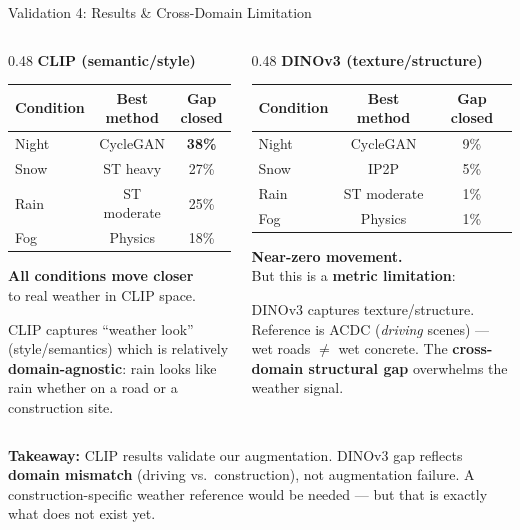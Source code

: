 \documentclass[aspectratio=169, 11pt]{beamer}
\begin{document}
\begin{frame}{Validation 4: Results \& Cross-Domain Limitation}

\begin{columns}[T]
\begin{column}{0.48\textwidth}
\centering
\footnotesize
\textbf{CLIP (semantic/style)}

\vspace{0.3em}
\begin{tabular}{lcc}
\toprule
\textbf{Condition} & \textbf{Best method} & \textbf{Gap closed} \\
\midrule
Night & CycleGAN & \textbf{38\%} \\
Snow & ST heavy & 27\% \\
Rain & ST moderate & 25\% \\
Fog & Physics & 18\% \\
\bottomrule
\end{tabular}

\vspace{0.5em}
{\color{goodgreen}\textbf{All conditions move closer}}\\
{\color{goodgreen}to real weather in CLIP space.}

\vspace{0.3em}
{\small CLIP captures ``weather look'' (style/semantics) which is relatively \textbf{domain-agnostic}: rain looks like rain whether on a road or a construction site.}
\end{column}
\begin{column}{0.48\textwidth}
\centering
\footnotesize
\textbf{DINOv3 (texture/structure)}

\vspace{0.3em}
\begin{tabular}{lcc}
\toprule
\textbf{Condition} & \textbf{Best method} & \textbf{Gap closed} \\
\midrule
Night & CycleGAN & 9\% \\
Snow & IP2P & 5\% \\
Rain & ST moderate & 1\% \\
Fog & Physics & 1\% \\
\bottomrule
\end{tabular}

\vspace{0.5em}
{\color{warnred}\textbf{Near-zero movement.}}\\
{\color{warnred}But this is a \textbf{metric limitation}:}

\vspace{0.3em}
{\small DINOv3 captures texture/structure. Reference is ACDC (\textit{driving} scenes) --- wet roads $\neq$ wet concrete. The \textbf{cross-domain structural gap} overwhelms the weather signal.}
\end{column}
\end{columns}

\vspace{0.5em}
{\small \textbf{Takeaway:} CLIP results validate our augmentation. DINOv3 gap reflects \textbf{domain mismatch} (driving vs.\ construction), not augmentation failure. A construction-specific weather reference would be needed --- but that is exactly what does not exist yet.}
\end{frame}
\end{document}
